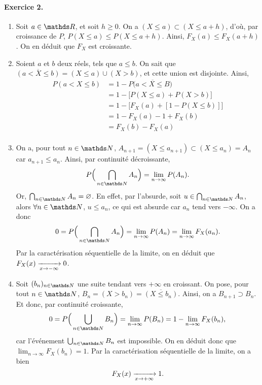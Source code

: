 \documentclass[a4paper]{article}
\begin{document}
	\paragraph{Exercice 2.}
	\begin{enumerate}
		\item Soit $a \in \R$, et soit $h \ge 0$. On a $(X \le a) \subset (X \le a + h)$, d'où, par croissance de $P$, $P(X \le a) \le P(X \le a + h)$. Ainsi, $F_X(a) \le F_X(a+h)$.
			On en déduit que $F_X$\/ est croissante.
		\item Soient $a$\/ et $b$\/ deux réels, tels que $a \le b$. On sait que $\overline{(a < X \le b)} = (X \le a) \cup (X > b)$, et cette union est disjointe.
			Ainsi,
			\begin{align*}
				P(a < X \le b) &= 1 - P\big(\overline{a < X \le B}\big)\\
				&= 1 - \big[P(X \le a) + P(X > b)\big] \\
				&= 1 - \big[F_X(a) + [1 - P(X \le b)]\big] \\
				&= 1 - F_X(a) - 1 + F_X(b) \\
				&= F_X(b) - F_X(a) \\
			\end{align*}
		\item On a, pour tout $n \in \N$, $A_{n+1} = (X \le a_{n+1}) \subset (X \le a_n) = A_n$\/ car $a_{n+1} \le a_n$. Ainsi, par continuité décroissante, \[
				P\Big(\bigcap_{n \in \N} A_n \Big) = \lim_{n\to \infty} P(A_n)
			.\] Or, $\bigcap_{n \in \N} A_n = \O$. En effet, par l'absurde, soit $u \in \bigcap_{n \in \N} A_n$, alors $\forall n \in \N$, $u \le a_n$, ce qui est absurde car $a_n$\/ tend vers $-\infty$. On a donc \[
				0 = P\Big(\bigcap_{n\in \N}  A_n\Big) = \lim_{n \to \infty}P(A_n) = \lim_{n\to \infty} F_X(a_n)
			.\] Par la caractérisation séquentielle de la limite, on en déduit que $F_X(x) \xrightarrow[x\to -\infty]{} 0$.
		\item Soit $(b_n)_{n\in\N}$\/ une suite tendant vers $+\infty$\/ en croissant.
			On pose, pour tout $n \in \N$, $B_n = (X > b_n) = \overline{(X \le b_n)}$.
			Ainsi, on a $B_{n+1} \supset B_n$. Et donc, par continuité croissante, \[
				0 = P\Big(\bigcup_{n \in \N} B_n\Big) = \lim_{n\to \infty} P(B_n) = 1 - \lim_{n\to \infty} F_X(b_n)
			,\] car l'événement $\bigcup_{n \in \N} B_n$\/ est impossible.
			On en déduit donc que $\lim_{n\to \infty} F_X(b_n) = 1$. Par la caractérisation séquentielle de la limite, on a bien \[
				F_X(x) \xrightarrow[x\to +\infty]{} 1
			.\]
	\end{enumerate}
\end{document}
